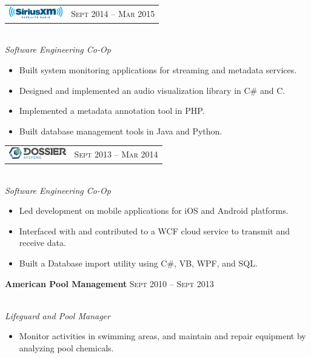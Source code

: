 \documentclass[10pt]{article}
\begin{document}
{\begin{minipage}[t]{0.5\textwidth}
\begin{tabular}{ L{5cm} R{3.5cm} }
\includegraphics[height=0.5cm]{siriusxm} & 
{\raggedleft\textsc{Sept 2014 -- Mar 2015}} \\
\end{tabular}
{\raggedright\large \\
\textit{Software Engineering Co-Op}\\[5pt]}

\begin{itemize}
  \setlength\itemsep{0.4mm}
  \item[\ding{226}] Built system monitoring applications for streaming and metadata services.
  \item[\ding{226}] Designed and implemented an audio visualization library in C\# and C.
  \item[\ding{226}] Implemented a metadata annotation tool in PHP.
   \item[\ding{226}] Built database management tools in Java and Python.
\end{itemize}


\begin{tabular}{ L{5cm} R{3.5cm} }
\includegraphics[height=0.5cm]{dossier} & 
{\raggedleft\textsc{Sept 2013 -- Mar 2014}} \\
\end{tabular}
{\raggedright\large\\
\textit{Software Engineering Co-Op}\\[5pt]}



\begin{itemize}
  \setlength\itemsep{0.4mm}
  \item[\ding{226}] Led development on mobile applications for iOS and Android platforms.
  \item[\ding{226}] Interfaced with and contributed to a WCF cloud service to transmit and receive data.
  \item[\ding{226}] Built a Database import utility using C\#, VB, WPF, and SQL.
\end{itemize}

\textbf{American Pool Management} \hfill \textsc{Sept 2010 -- Sept 2013}
{\raggedright\large\\
\textit{Lifeguard and Pool Manager}\\[5pt]}
\vspace{-0.5 cm}
\begin{itemize}
  \item[\ding{226}] Monitor activities in swimming areas, and maintain and repair equipment by analyzing pool chemicals.
\end{itemize}


\end{minipage}}
\end{document}

